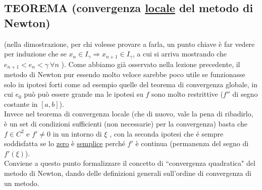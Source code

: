 \subsection{TEOREMA (convergenza \uline{locale} del metodo di Newton)}
\begin{center}
\end{center}
(nella dimostrazione, per chi volesse provare a farla, un punto chiave è far vedere per induzione che se $x_n \in I_\gamma \Rightarrow x_{n+1}\in I_\gamma$, a cui si arriva mostrando che  $e_{n+1}<e_n<\gamma \ \forall n$ ).
\newline \newline
Come abbiamo già osservato nella lezione precedente, il metodo di Newton pur essendo molto veloce sarebbe poco utile se funzionasse solo in ipotesi forti come ad esempio quelle del teorema di convergenza globale, in cui $e_0$ può può essere grande ma le ipotesi su $f$ sono molto restrittive ($f''$ di segno costante in $[a,b]$).\\
Invece nel teorema di convergenza locale  (che di nuovo, vale la pena di ribadirlo, è un set di condizioni sufficienti (non necessarie) per la convergenza) basta che $ f\in C^2$  e  $ f'\neq 0 $ in un intorno di  $ \xi $ , con la seconda ipotesi che é sempre soddisfatta se lo \uline{zero} è \uline{semplice} perché $f'$ è continua (permanenza del segno di $f'(\xi)$).\\
Conviene a questo punto formalizzare il concetto di ``convergenza quadratica" del metodo di Newton, dando delle definizioni generali sull'ordine di convergenza di un metodo. 

